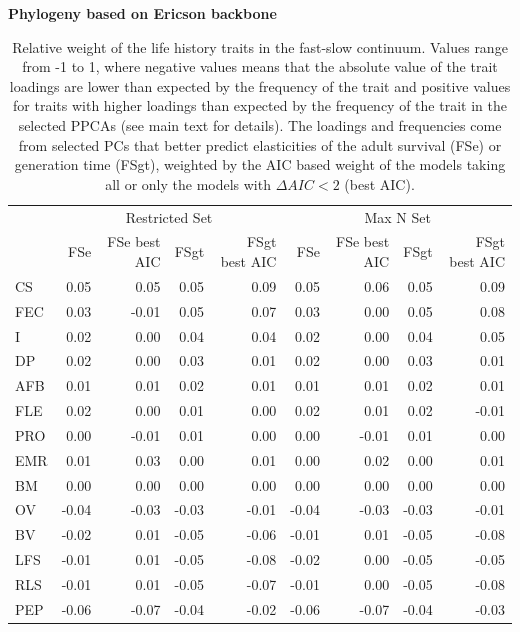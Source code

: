 \clearpage%
\begin{table}
\center
\caption[LHT relative importance of the FS axes]{
Relative weight of the life history traits in the fast-slow continuum. Values
range from -1 to 1, where negative values means that the absolute value of the
trait loadings are lower than expected by the frequency of the trait and
positive values for traits with higher loadings than expected by the frequency
of the trait in the selected PPCAs (see main text for details). The loadings and
frequencies come from selected PCs that better predict elasticities of the
adult survival (FSe) or generation time (FSgt), weighted by the AIC based weight
of the models taking all or only the models with $\Delta AIC < 2$ (best AIC).
}
\label{tab:tabApp2.1.3}
\begin{footnotesize}

\textbf{Phylogeny based on Ericson backbone}

\begin{tabular}{@{}l|rrrr|rrrr@{}}
\toprule
  & \multicolumn{4}{c|}{Restricted Set} & \multicolumn{4}{c}{Max N Set}\\
  & FSe & FSe best AIC & FSgt & FSgt best AIC & FSe & FSe best AIC & FSgt & FSgt best AIC\\
\midrule
CS & 0.05 & 0.05 & 0.05 & 0.09 & 0.05 & 0.06 & 0.05 & 0.09\\
FEC & 0.03 & -0.01 & 0.05 & 0.07 & 0.03 & 0.00 & 0.05 & 0.08\\
I & 0.02 & 0.00 & 0.04 & 0.04 & 0.02 & 0.00 & 0.04 & 0.05\\
DP & 0.02 & 0.00 & 0.03 & 0.01 & 0.02 & 0.00 & 0.03 & 0.01\\
AFB & 0.01 & 0.01 & 0.02 & 0.01 & 0.01 & 0.01 & 0.02 & 0.01\\
FLE & 0.02 & 0.00 & 0.01 & 0.00 & 0.02 & 0.01 & 0.02 & -0.01\\
PRO & 0.00 & -0.01 & 0.01 & 0.00 & 0.00 & -0.01 & 0.01 & 0.00\\
EMR & 0.01 & 0.03 & 0.00 & 0.01 & 0.00 & 0.02 & 0.00 & 0.01\\
BM & 0.00 & 0.00 & 0.00 & 0.00 & 0.00 & 0.00 & 0.00 & 0.00\\
OV & -0.04 & -0.03 & -0.03 & -0.01 & -0.04 & -0.03 & -0.03 & -0.01\\
BV & -0.02 & 0.01 & -0.05 & -0.06 & -0.01 & 0.01 & -0.05 & -0.08\\
LFS & -0.01 & 0.01 & -0.05 & -0.08 & -0.02 & 0.00 & -0.05 & -0.05\\
RLS & -0.01 & 0.01 & -0.05 & -0.07 & -0.01 & 0.00 & -0.05 & -0.08\\
PEP & -0.06 & -0.07 & -0.04 & -0.02 & -0.06 & -0.07 & -0.04 & -0.03\\
\bottomrule
\end{tabular}


\end{footnotesize}
\end{table}
